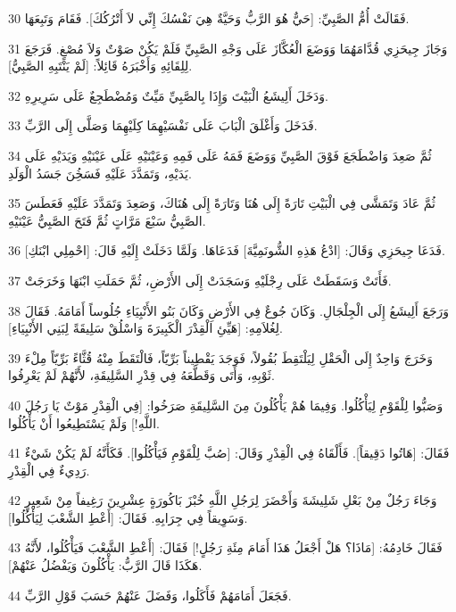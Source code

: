 \par 30 فَقَالَتْ أُمُّ الصَّبِيِّ: [حَيٌّ هُوَ الرَّبُّ وَحَيَّةٌ هِيَ نَفْسُكَ إِنِّي لاَ أَتْرُكُكَ]. فَقَامَ وَتَبِعَهَا.
\par 31 وَجَازَ جِيحَزِي قُدَّامَهُمَا وَوَضَعَ الْعُكَّازَ عَلَى وَجْهِ الصَّبِيِّ فَلَمْ يَكُنْ صَوْتٌ وَلاَ مُصْغٍ. فَرَجَعَ لِلِقَائِهِ وَأَخْبَرَهُ قَائِلاً: [لَمْ يَنْتَبِهِ الصَّبِيُّ].
\par 32 وَدَخَلَ أَلِيشَعُ الْبَيْتَ وَإِذَا بِالصَّبِيِّ مَيِّتٌ وَمُضْطَجِعٌ عَلَى سَرِيرِهِ.
\par 33 فَدَخَلَ وَأَغْلَقَ الْبَابَ عَلَى نَفْسَيْهِمَا كِلَيْهِمَا وَصَلَّى إِلَى الرَّبِّ.
\par 34 ثُمَّ صَعِدَ وَاضْطَجَعَ فَوْقَ الصَّبِيِّ وَوَضَعَ فَمَهُ عَلَى فَمِهِ وَعَيْنَيْهِ عَلَى عَيْنَيْهِ وَيَدَيْهِ عَلَى يَدَيْهِ، وَتَمَدَّدَ عَلَيْهِ فَسَخُِنَ جَسَدُ الْوَلَدِ.
\par 35 ثُمَّ عَادَ وَتَمَشَّى فِي الْبَيْتِ تَارَةً إِلَى هُنَا وَتَارَةً إِلَى هُنَاكَ، وَصَعِدَ وَتَمَدَّدَ عَلَيْهِ فَعَطَسَ الصَّبِيُّ سَبْعَ مَرَّاتٍ ثُمَّ فَتَحَ الصَّبِيُّ عَيْنَيْهِ.
\par 36 فَدَعَا جِيحَزِي وَقَالَ: [ادْعُ هَذِهِ الشُّونَمِيَّةَ] فَدَعَاهَا. وَلَمَّا دَخَلَتْ إِلَيْهِ قَالَ: [احْمِلِي ابْنَكِ].
\par 37 فَأَتَتْ وَسَقَطَتْ عَلَى رِجْلَيْهِ وَسَجَدَتْ إِلَى الأَرْضِ، ثُمَّ حَمَلَتِ ابْنَهَا وَخَرَجَتْ.
\par 38 وَرَجَعَ أَلِيشَعُ إِلَى الْجِلْجَالِ. وَكَانَ جُوعٌ فِي الأَرْضِ وَكَانَ بَنُو الأَنْبِيَاءِ جُلُوساً أَمَامَهُ. فَقَالَ لِغُلاَمِهِ: [هَيِّئِ الْقِدْرَ الْكَبِيرَةَ وَاسْلُقْ سَلِيقَةً لِبَنِي الأَنْبِيَاءِ].
\par 39 وَخَرَجَ وَاحِدٌ إِلَى الْحَقْلِ لِيَلْتَقِطَ بُقُولاً، فَوَجَدَ يَقْطِيناً بَرِّيّاً، فَالْتَقَطَ مِنْهُ قُثَّاءً بَرِّيّاً مِلْءَ ثَوْبِهِ، وَأَتَى وَقَطَّعَهُ فِي قِدْرِ السَّلِيقَةِ، لأَنَّهُمْ لَمْ يَعْرِفُوا.
\par 40 وَصَبُّوا لِلْقَوْمِ لِيَأْكُلُوا. وَفِيمَا هُمْ يَأْكُلُونَ مِنَ السَّلِيقَةِ صَرَخُوا: [فِي الْقِدْرِ مَوْتٌ يَا رَجُلَ اللَّهِ!] وَلَمْ يَسْتَطِيعُوا أَنْ يَأْكُلُوا.
\par 41 فَقَالَ: [هَاتُوا دَقِيقاً]. فَأَلْقَاهُ فِي الْقِدْرِ وَقَالَ: [صُبَّ لِلْقَوْمِ فَيَأْكُلُوا]. فَكَأَنَّهُ لَمْ يَكُنْ شَيْءٌ رَدِيءٌ فِي الْقِدْرِ.
\par 42 وَجَاءَ رَجُلٌ مِنْ بَعْلِ شَلِيشَةَ وَأَحْضَرَ لِرَجُلِ اللَّهِ خُبْزَ بَاكُورَةٍ عِشْرِينَ رَغِيفاً مِنْ شَعِيرٍ وَسَوِيقاً فِي جِرَابِهِ. فَقَالَ: [أَعْطِ الشَّعْبَ لِيَأْكُلُوا].
\par 43 فَقَالَ خَادِمُهُ: [مَاذَا؟ هَلْ أَجْعَلُ هَذَا أَمَامَ مِئَةِ رَجُلٍ!] فَقَالَ: [أَعْطِ الشَّعْبَ فَيَأْكُلُوا، لأَنَّهُ هَكَذَا قَالَ الرَّبُّ: يَأْكُلُونَ وَيَفْضُلُ عَنْهُمْ].
\par 44 فَجَعَلَ أَمَامَهُمْ فَأَكَلُوا، وَفَضَلَ عَنْهُمْ حَسَبَ قَوْلِ الرَّبِّ.

